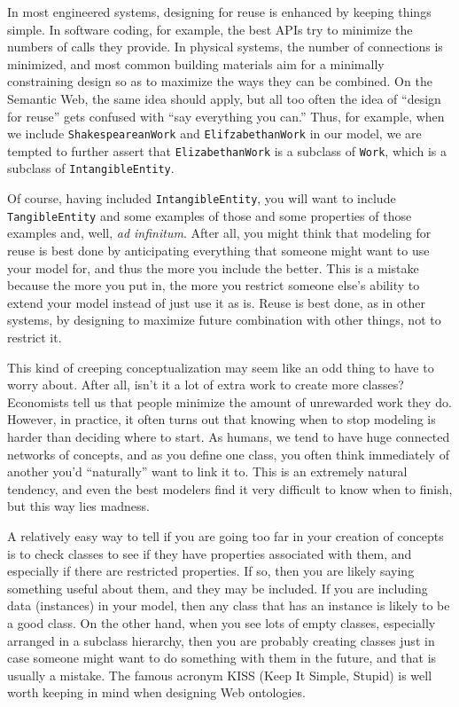In most engineered systems, designing for reuse is enhanced by keeping
things simple. In software coding, for example, the best APIs try to
minimize the numbers of calls they provide. In physical systems, the
number of connections is minimized, and most common building materials
aim for a minimally constraining design so as to maximize the ways they
can be combined. On the Semantic Web, the same idea should apply, but
all too often the idea of ``design for reuse'' gets confused with ``say
everything you can.'' Thus, for example, when we include
\texttt{ShakespeareanWork} and \texttt{ElifzabethanWork} in our model, we are tempted to
further assert that \texttt{ElizabethanWork} is a subclass of \texttt{Work}, which is a
subclass of \texttt{IntangibleEntity}.

Of course, having included \texttt{IntangibleEntity}, you will want to include
\texttt{TangibleEntity} 
and some examples of those and some properties of those examples and,
well, \emph{ad infinitum}. After all, you might think that modeling for reuse
is best done by anticipating everything that someone might want to use
your model for, and thus the more you include the better. This is a
mistake because the more you put in, the more you restrict someone
else's ability to extend your model instead of just use it
as is. Reuse is best done, as in other systems, by designing to maximize
future combination with other things, not to restrict it.

This kind of creeping conceptualization may seem like an odd thing to
have to worry about. After all, isn't it a lot of extra work to create
more classes? Economists tell us that people minimize the amount of
unrewarded work they do. However, in practice, it often turns out that
knowing when to stop modeling is harder than deciding where to start. As
humans, we tend to have huge connected networks of concepts, and as you
define one class, you often think immediately of another you'd
``naturally'' want to link it to. This is an extremely natural tendency,
and even the best modelers find it very difficult to know when to
finish, but this way lies madness.

A relatively easy way to tell if you are going too far in your creation
of concepts is to check classes to see if they have properties
associated with them, and especially if there are restricted properties.
If so, then you are likely saying something useful about them, and they
may be included. If you are including data (instances) in your model,
then any class that has an instance is likely to be a good class. On the
other hand, when you see lots of empty classes, especially arranged in a
subclass hierarchy, then you are probably creating classes just in case
someone might want to do something with them in the future, and that is
usually a mistake. The famous acronym KISS (Keep It Simple, Stupid) is
well worth keeping in mind when designing Web ontologies.

